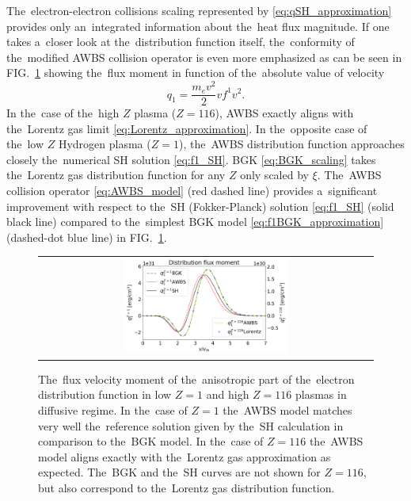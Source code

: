 \documentclass[
 aps,
 jmp,
 amsmath,amssymb,
 twocolumn,
]{revtex4-1}
\newcommand{\figref}[1]{FIG.~\ref{#1}}
\newcommand{\Zbar}{Z}
\newcommand{\vmag}{v}
\newcommand{\me}{m_e}
\newcommand{\ft}{f}
\begin{document}
The~electron-electron collisions scaling 
\cite{Epperlein_PoFB1991} represented by 
\eqref{eq:qSH_approximation} provides only an~integrated information about
the~heat flux magnitude. If one takes a~closer look at the~distribution
function itself, the~conformity of the~modified AWBS collision operator
is even more emphasized as can be seen in \figref{fig:q1s_summary} showing
the~flux moment in function of the~absolute value of velocity
\begin{equation}
  q_1 = \frac{\me\vmag^2}{2}\vmag \ft^1 \vmag^2 .
  \label{eq:q1}
\end{equation}
In the~case of the~high $\Zbar$ plasma ($\Zbar = 116$), 
AWBS exactly aligns with the~Lorentz gas limit \eqref{eq:Lorentz_approximation}.
In the~opposite case of the~low
$\Zbar$ Hydrogen plasma ($\Zbar = 1$), the~AWBS distribution function 
approaches closely the~numerical SH solution \eqref{eq:f1_SH}. 
BGK \eqref{eq:BGK_scaling} takes 
the~Lorentz gas distribution function for any $\Zbar$ 
only scaled by $\xi$.  
The~AWBS collision operator \eqref{eq:AWBS_model} (red dashed line) 
provides 
a~significant improvement with respect to the~SH (Fokker-Planck) solution
\eqref{eq:f1_SH} (solid black line) compared to the~simplest BGK model 
\eqref{eq:f1BGK_approximation} (dashed-dot blue line) 
in \figref{fig:q1s_summary}.

\begin{figure}[tbh]
  \begin{center}
    \begin{tabular}{c}
      \includegraphics[width=0.5\textwidth]{q1s.png}
    \end{tabular}
  \caption{  
  The~flux velocity moment of the~anisotropic part of the~electron distribution 
  function in low $\Zbar=1$ and high $\Zbar=116$ plasmas in diffusive regime. 
  In the~case of $\Zbar = 1$ the~AWBS model matches very well 
  the~reference solution given by the~SH calculation \cite{SpitzerHarm_PR1953} 
  in comparison to the~BGK model. In the~case of $\Zbar = 116$ the~AWBS model
  aligns exactly with the~Lorentz gas approximation as expected. 
  The~BGK and the~SH curves are not shown for $\Zbar = 116$, but also 
  correspond to the~Lorentz gas distribution function.
  }
  \label{fig:q1s_summary}
  \end{center} 
\end{figure}
\end{document}
